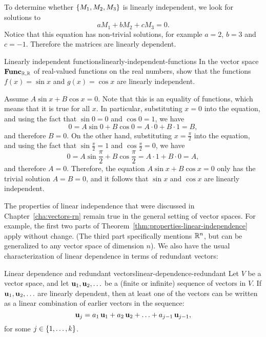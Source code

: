 \begin{solution}
  To determine whether $\left\{M_1,M_2,M_3\right\}$ is linearly independent, we
  look for solutions to
  \begin{equation*}
    aM_1 + bM_2 + cM_3 = 0.
  \end{equation*}
  Notice that this equation has non-trivial solutions, for example
  $a=2$, $b=3$ and $c=-1$. Therefore the matrices are linearly
  dependent.
\end{solution}

\begin{example}{Linearly independent functions}{linearly-independent-functions}
  In the vector space $\mathbf{Func}_{\mathbb{R},\mathbb{R}}$ of real-valued functions on the
  real numbers, show that the functions $f(x)=\sin x$ and $g(x)=\cos
  x$ are linearly independent.
\end{example}

\begin{solution}
  Assume $A\sin x+B\cos x=0$. Note that this is an equality of
  functions, which means that it is true for all $x$. In particular,
  substituting $x=0$ into the equation, and using the fact that
  $\sin 0=0$ and $\cos 0=1$, we have
  \begin{equation*}
    0 = A\sin 0 + B\cos 0 = A\cdot 0 + B\cdot 1 = B,
  \end{equation*}
  and therefore $B=0$. On the other hand, substituting
  $x=\frac{\pi}{2}$ into the equation, and using the fact that
  $\sin\frac{\pi}{2} = 1$ and $\cos\frac{\pi}{2}=0$, we have
  \begin{equation*}
    0 = A\sin\frac{\pi}{2} + B\cos\frac{\pi}{2} = A\cdot 1 + B\cdot 0
    = A,
  \end{equation*}
  and therefore $A=0$. Therefore, the equation $A\sin x+B\cos x=0$
  only has the trivial solution $A=B=0$, and it follows that $\sin x$
  and $\cos x$ are linearly independent.
\end{solution}

The properties of linear independence that were discussed in
Chapter~\ref{cha:vectors-rn} remain true in the general setting of
vector spaces. For example, the first two parts of
Theorem~\ref{thm:properties-linear-independence} apply without change.
(The third part specifically mentions $\mathbb{R}^n$, but can be generalized
to any vector space of dimension $n$). We also have the usual
characterization of linear dependence in terms of redundant vectors:

\begin{proposition}{Linear dependence and redundant vectors}{linear-dependence-redundant}
  Let $V$ be a vector space, and let $\mbox{\bf u}_1,\mbox{\bf u}_2,\ldots$ be
  a (finite or infinite) sequence of vectors in $V$. If
  $\mbox{\bf u}_1,\mbox{\bf u}_2,\ldots$ are linearly dependent, then at least
  one of the vectors can be written as a linear combination of earlier
  vectors in the sequence:
  \begin{equation*}
    \mbox{\bf u}_j = a_1\,\mbox{\bf u}_1 + a_2\,\mbox{\bf u}_2 + \ldots + a_{j-1}\,\mbox{\bf u}_{j-1},
  \end{equation*}
  for some $j\in\left\{1,\ldots,k\right\}$.
\end{proposition}

